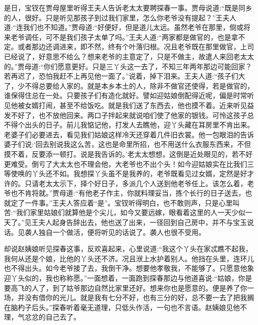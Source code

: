 \begin{parag}
    是日，宝钗在贾母屋里听得王夫人告诉老太太要聘探春一事。贾母说道:“既是同乡的人，很好。只是听见那孩子到过我们家里，怎么你老爷没有提起？”王夫人道:“连我们也不知道。”贾母道:“好便好，但是道儿太远。虽然老爷在那里，倘或将来老爷调任，可不是我们孩子太单了吗。”王夫人道:“两家都是做官的，也是拿不定。或者那边还调进来，即不然，终有个叶落归根。况且老爷既在那里做官，上司已经说了，好意思不给么？想来老爷的主意定了，只是不做主，故遣人来回老太太的。”贾母道:“你们愿意更好。只是三丫头这一去了，不知三年两年那边可能回家？若再迟了，恐怕我赶不上再见他一面了。”说着，掉下泪来。王夫人道:“孩子们大了，少不得总要给人家的。就是本乡本土的人，除非不做官还使得，若是做官的，谁保得住总在一处。只要孩子们有造化就好。譬如迎姑娘倒配得近呢，偏是时常听见他被女婿打闹，甚至不给饭吃。就是我们送了东西去，他也摸不着。近来听见益发不好了，也不放他回来。两口子拌起来就说咱们使了他家的银钱。可怜这孩子总不得个出头的日子。前儿我惦记他，打发人去瞧他，迎丫头藏在耳房里不肯出来。老婆子们必要进去，看见我们姑娘这样冷天还穿着几件旧衣裳。他一包眼泪的告诉婆子们说:‘回去别说我这么苦，这也是命里所招，也不用送什么衣服东西来，不但摸不着，反要添一顿打。说是我告诉的。’老太太想想，这倒是近处眼见的，若不好更难受。倒亏了大太太也不理会他，大老爷也不出个头！如今迎姑娘实在比我们三等使唤的丫头还不如。我想探丫头虽不是我养的，老爷既看见过女婿，定然是好才许的。只请老太太示下，择个好日子，多派几个人送到他老爷任上。该怎么着，老爷也不肯将就。”贾母道:“有他老子作主，你就料理妥当，拣个长行的日子送去，也就定了一件事。”王夫人答应着“是”。宝钗听得明白，也不敢则声，只是心里叫苦:“我们家里姑娘们就算他是个尖儿，如今又要远嫁，眼看着这里的人一天少似一天了。”见王夫人起身告辞出去，他也送了出来，一径回到自己房中，并不与宝玉说话。见袭人独自一个做活，便将听见的话说了。袭人也很不受用。
\end{parag}


\begin{parag}
    却说赵姨娘听见探春这事，反欢喜起来，心里说道:“我这个丫头在家忒瞧不起我，我何从还是个娘，比他的丫头还不济。况且洑上水护着别人。他挡在头里，连环儿也不得出头。如今老爷接了去，我倒干净。想要他孝敬我，不能够了。只愿意他象迎丫头似的，我也称称愿。”一面想着，一面跑到探春那边与他道喜说:“姑娘，你是要高飞的人了，到了姑爷那边自然比家里还好。想来你也是愿意的。便是养了你一场，并没有借你的光儿。就是我有七分不好，也有三分的好，总不要一去了把我搁在脑杓子后头。”探春听着毫无道理，只低头作活，一句也不言语。赵姨娘见他不理，气忿忿的自己去了。
\end{parag}


